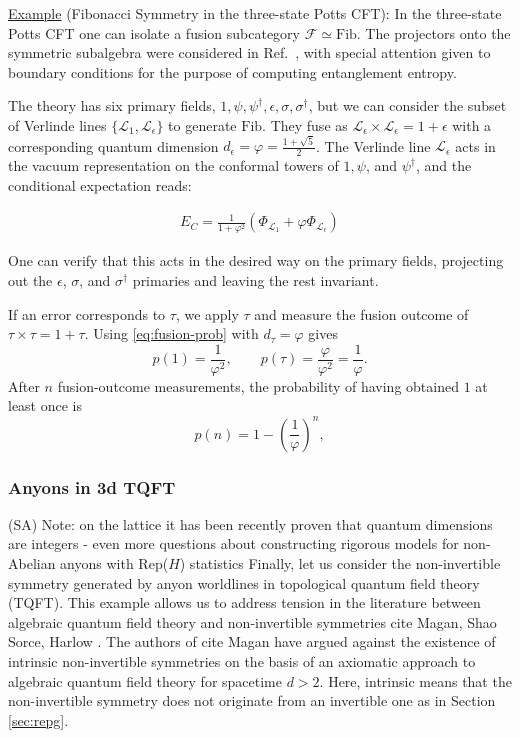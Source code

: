 \documentclass{article}
\theoremstyle{definition}
\newcommand{\SA}[1]{{\color{sulaiman}\footnotesize{(SA) #1}}}
\begin{document}
  \underline{Example} (Fibonacci Symmetry in the three-state Potts CFT): In the three-state
  Potts CFT one can isolate a fusion subcategory $\mathcal{F}\simeq \text{Fib}$.
  The projectors onto the symmetric subalgebra were considered in Ref.~\cite{heymann2025revisitingsrefornis},
  with special attention given to boundary conditions for the purpose of
  computing entanglement entropy.

  The theory has six primary fields, $1, \psi, \psi^{\dagger}, \epsilon, \sigma ,
  \sigma^{\dagger}$, but we can consider the subset of Verlinde lines
  $\{\mathcal{L}_{1}, \mathcal{L}_{\epsilon}\}$ to generate $\text{Fib}$. They fuse
  as $\mathcal{L}_{\epsilon}\times \mathcal{L}_{\epsilon}= 1 + \epsilon$ with a corresponding
  quantum dimension $d_{\epsilon}= \varphi = \frac{1 + \sqrt{5}}{2}$. The
  Verlinde line $\mathcal{L}_{\epsilon}$ acts in the vacuum representation on
  the conformal towers of $1, \psi$, and $\psi^{\dagger}$, and the conditional
  expectation reads:

  \begin{eqnarray}
    E_C = \frac{1}{1+\varphi^{2}}(\Phi_{\mathcal{L}_1}+\varphi \Phi_{\mathcal{L}_\epsilon})
  \end{eqnarray}

  One can verify that this acts in the desired way on the primary fields,
  projecting out the $\epsilon$, $\sigma$, and $\sigma^{\dagger}$ primaries and
  leaving the rest invariant.

  If an error corresponds to $\tau$, we apply $\tau$ and measure the fusion outcome
  of $\tau\times\tau=1+\tau$. Using \eqref{eq:fusion-prob} with $d_{\tau}=\varphi$
  gives
  \begin{equation}
    p(1)=\frac{1}{\varphi^{2}},\qquad p(\tau)=\frac{\varphi}{\varphi^{2}}=\frac{1}{\varphi}
    .
  \end{equation}
  After $n$ fusion-outcome measurements, the probability of having obtained $1$
  at least once is
  \begin{equation}
    p(n)=1-\left(\frac{1}{\varphi}\right)^{n},
  \end{equation}

  \subsubsection{Anyons in 3d TQFT}
  \label{sec:tqft} \SA{Note: on the lattice it has been recently proven that quantum dimensions are integers - even more questions about constructing rigorous models for non-Abelian anyons with Rep($H$) statistics}
  Finally, let us consider the non-invertible symmetry generated by anyon worldlines
  in topological quantum field theory (TQFT). This example allows us to address
  tension in the literature between algebraic quantum field theory and non-invertible
  symmetries
  \color{brown}
  cite Magan, Shao Sorce, Harlow
  \color{black}
  . The authors of
  \color{brown}
  cite Magan
  \color{black}
  have argued against the existence of intrinsic non-invertible symmetries on
  the basis of an axiomatic approach to algebraic quantum field theory for
  spacetime $d>2$. Here, intrinsic means that the non-invertible symmetry does
  not originate from an invertible one as in Section \ref{sec:repg}.
\end{document}
